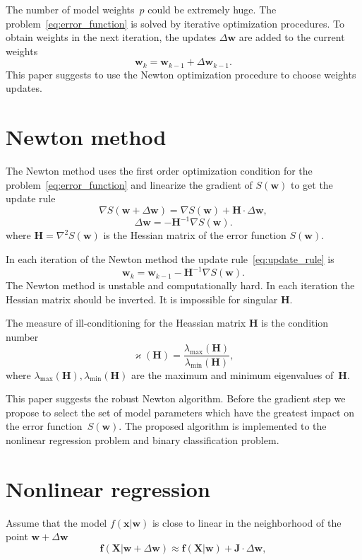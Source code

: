 \documentclass[a4paper,12pt]{article}
\renewcommand{\kappa}{\ensuremath{\varkappa}}
\theoremstyle{plain} %
\theoremstyle{definition} %
\theoremstyle{remark} %
\newcommand{\bw}{\mathbf{w}}
\newcommand{\bx}{\mathbf{x}}
\newcommand{\bJ}{\mathbf{J}}
\newcommand{\bH}{\mathbf{H}}
\newcommand{\bX}{\mathbf{X}}
\begin{document}
	The number of model weights~$p$ could be extremely huge. 
	The problem~\eqref{eq:error_function} is solved by iterative optimization procedures. 
	To obtain weights in the next iteration, the updates $\Delta \bw$ are added to the current weights
	\begin{equation}
		\bw_k = \bw_{k - 1} + \Delta \bw_{k - 1}.
		\label{eq:update_rule}
	\end{equation}
	This paper suggests to use the Newton optimization procedure to choose weights updates.

	\section*{Newton method}
	
	The Newton method uses the first order optimization condition for the problem~\eqref{eq:error_function} and linearize the gradient of $S(\bw)$ to get the update rule
	\[
		\nabla S (\bw + \Delta \bw) = \nabla S(\bw) + \bH \cdot \Delta \bw,
	\]
	\[
		\Delta \bw = - \bH^{-1} \nabla S(\bw).
	\]
	where $\bH = \nabla^2 S(\bw)$ is the Hessian matrix of the error function $S(\bw)$.
	
	In each iteration of the Newton method the update rule~\eqref{eq:update_rule} is
	\[
		\bw_k = \bw_{k-1} - \bH^{-1} \nabla S(\bw).
	\]
	The Newton method is unstable and computationally hard. In each iteration the Hessian matrix should be inverted. It is impossible for singular $\bH$.
	
	The measure of ill-conditioning for the Heassian matrix $\bH$ is the condition number
	\[
		\kappa(\bH) = \frac{\lambda_{\text{max}}(\bH)}{\lambda_{\text{min}}(\bH)},
	\]
	where $\lambda_{\text{max}}(\bH), \lambda_{\text{min}}(\bH)$ are the maximum and minimum eigenvalues of~$\bH$.
	
	This paper suggests the robust Newton algorithm. 
	Before the gradient step we propose to select the set of model parameters which have the greatest impact on the error function~$S(\bw)$.
	The proposed algorithm is implemented to the nonlinear regression problem and binary classification problem.
	
	\section*{Nonlinear regression}
	Assume that the model $f(\bx | \bw)$ is close to linear in the neighborhood of the point $\bw + \Delta \bw$
	\[
	\mathbf{f}(\bX | \bw + \Delta \bw) \approx \mathbf{f}(\bX | \bw) + \bJ \cdot \Delta  \bw,
	\]
	
\end{document}

